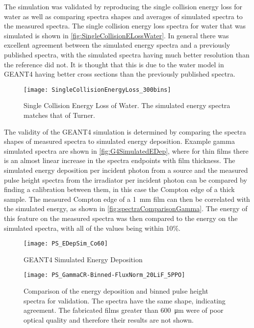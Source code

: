 The simulation was validated by reproducing the single collision energy loss for water as well as comparing spectra shapes and averages of simulated spectra to the measured spectra.
The single collision energy loss spectra for water that was simulated is shown in \autoref{fig:SingleCollisionELossWater}.
In general there was excellent agreement between the simulated energy spectra and a previously published spectra\cite{turner_comparative_1982}, with the simulated spectra having much better resolution than the reference did not.
It is thought that this is due to the water model in GEANT4 having better cross sections than the previously published spectra.
\begin{figure}[ht]
  \centering
  \texttt{[image: SingleCollisionEnergyLoss\_300bins]}
  \caption{Single Collision Energy Loss of Water. The simulated energy spectra matches that of Turner\cite{turner_comparative_1982}.}
	\label{fig:SingleCollisionELossWater}
\end{figure}

The validity of the GEANT4 simulation is determined by comparing the spectra shapes of measured spectra to simulated energy deposition.
Example gamma simulated spectra are shown in \autoref{fig:G4SimulatedEDep}, where for thin films there is an almost linear increase in the spectra endpoints with film thickness.
The simulated energy deposition per incident photon from a  source and the measured pulse height spectra from the  irradiator per incident photon can be compared by finding a calibration between them, in this case the Compton edge of a thick sample.
The measured Compton edge of a \SI{1}{\mm} film can then be correlated with the simulated energy, as shown in \autoref{fig:spectraComparisonGamma}.
The energy of this feature on the measured spectra was then compared to the energy on the simulated spectra, with all of the values being within 10\%.
\begin{figure}
	\centering
    	\texttt{[image: PS\_EDepSim\_Co60]}
	\caption[GEANT4 Simulated Gamma Spectra in PS]{GEANT4 Simulated Energy Deposition}
	\label{fig:G4SimulatedEDep}
\end{figure}
\begin{figure}
	\centering
   	\texttt{[image: PS\_GammaCR-Binned-FluxNorm\_20LiF\_5PPO]}
	\caption{Comparison of the energy deposition and binned pulse height spectra for validation. The spectra have the same shape, indicating agreement. The fabricated films greater than \SI{600}{\um} were of poor optical quality and therefore their results are not shown.}
	\label{fig:spectraComparisonGamma}
\end{figure}

